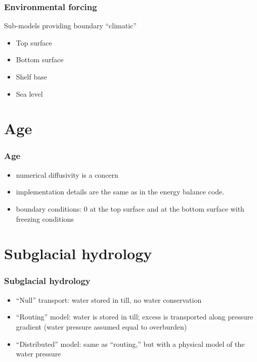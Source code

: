 \documentclass[hide notes,intlimits]{beamer}
\begin{document}
\begin{frame}
  \frametitle{Environmental forcing}

  Sub-models providing boundary ``climatic''

  \begin{itemize}
  \item Top surface
  \item Bottom surface
  \item Shelf base
  \item Sea level
  \end{itemize}
\end{frame}


\section{Age}
\label{sec:age}

\begin{frame}
  \frametitle{Age}

  \begin{itemize}
  \item numerical diffusivity is a concern
  \item implementation details are the same as in the energy balance code.
  \item boundary conditions: $0$ at the top surface and at the bottom
    surface with freezing conditions
  \end{itemize}

\end{frame}

\section{Subglacial hydrology}
\label{sec:subglacial-hydrology}

\begin{frame}
  \frametitle{Subglacial hydrology}

  \begin{itemize}
  \item ``Null'' transport: water stored in till, no water conservation
  \item ``Routing'' model: water is stored in till; excess is
    transported along pressure gradient (water pressure assumed equal
    to overburden)
  \item ``Distributed'' model: same as ``routing,'' but with a
    physical model of the water pressure
  \end{itemize}
\end{frame}
\end{document}
